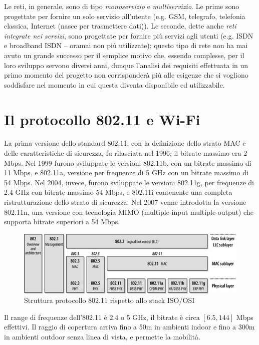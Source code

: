 Le reti, in generale, sono di tipo \textit{monoservizio} e \textit{multiservizio}. Le prime sono progettate per fornire un solo servizio all'utente (e.g. GSM, telegrafo, telefonia classica, Internet (nasce per trasmettere dati)). Le seconde, dette anche \textit{reti integrate nei servizi}, sono progettate per fornire più servizi agli utenti (e.g. ISDN e broadband ISDN -- oramai non più utilizzate); questo tipo di rete non ha mai avuto un grande successo per il semplice motivo che, essendo complesse, per il loro sviluppo servono diversi anni, dunque l'analisi dei requisiti effettuata in un primo momento del progetto non corrisponderà più alle esigenze che si vogliono soddisfare nel momento in cui questa diventa disponibile ed utilizzabile.

\section{Il protocollo 802.11 e Wi-Fi}
La prima versione dello standard 802.11, con la definizione dello strato MAC e delle caratteristiche di sicurezza, fu rilasciata nel 1996; il bitrate massimo era 2 Mbps. Nel 1999 furono sviluppate le versioni 802.11b, con un bitrate massimo di 11 Mbps, e 802.11a, versione per frequenze di 5 GHz con un bitrate massimo di 54 Mbps. Nel 2004, invece, furono sviluppate le versioni 802.11g, per frequenze di 2.4 GHz con bitrate massimo 54 Mbps, e 802.11i contenente una completa ristrutturazione dello strato di sicurezza. Nel 2007 venne introdotta la versione 802.11n, una versione con tecnologia MIMO (multiple-input multiple-output) che supporta bitrate superiori a 54 Mbps.

\begin{figure}[htbp]
	\centering
	\includegraphics[scale = 0.7]{images/80211-iso}
	\caption{Struttura protocollo 802.11 rispetto allo stack ISO/OSI}
	\label{img:80211-iso}
\end{figure}

Il range di frequenze dell'802.11 è $2.4$ o $5$ GHz, il bitrate è circa $[6.5, 144]$ Mbps effettivi. Il raggio di copertura arriva fino a 50m in ambienti indoor e fino a 300m in ambienti outdoor senza linea di vista, e permette la mobilità.

